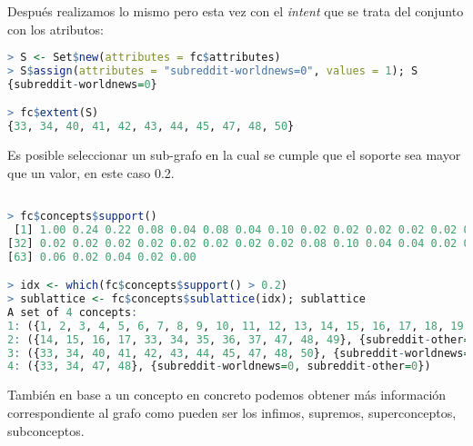 \documentclass[../../main.tex]{subfiles}
\begin{document}
\vskip 0.2in

Después realizamos lo mismo pero esta vez con el \textit{\gls{intent}} que se trata del conjunto con los atributos:

\begin{lstlisting}[language=R]
> S <- Set$new(attributes = fc$attributes)
> S$assign(attributes = "subreddit-worldnews=0", values = 1); S
{subreddit-worldnews=0}

> fc$extent(S)
{33, 34, 40, 41, 42, 43, 44, 45, 47, 48, 50}
\end{lstlisting}

\vskip 0.2in

Es posible seleccionar un sub-grafo en la cual se cumple que el soporte sea mayor que un valor, en este caso 0.2.

\begin{lstlisting}[language=R]

> fc$concepts$support()
 [1] 1.00 0.24 0.22 0.08 0.04 0.08 0.04 0.10 0.02 0.02 0.02 0.02 0.02 0.02 0.02 0.02 0.02 0.02 0.02 0.02 0.02 0.02 0.02 0.02 0.02 0.02 0.02 0.08 0.02 0.02 0.06
[32] 0.02 0.02 0.02 0.02 0.02 0.02 0.02 0.02 0.08 0.10 0.04 0.04 0.02 0.12 0.02 0.02 0.02 0.02 0.02 0.12 0.02 0.02 0.02 0.02 0.04 0.10 0.02 0.08 0.02 0.06 0.02
[63] 0.06 0.02 0.04 0.02 0.00

> idx <- which(fc$concepts$support() > 0.2)
> sublattice <- fc$concepts$sublattice(idx); sublattice
A set of 4 concepts:
1: ({1, 2, 3, 4, 5, 6, 7, 8, 9, 10, 11, 12, 13, 14, 15, 16, 17, 18, 19, 20, 21, 22, 23, 24, 25, 26, 27, 28, 29, 30, 31, 32, 33, 34, 35, 36, 37, 38, 39, 40, 41, 42, 43, 44, 45, 46, 47, 48, 49, 50}, {})
2: ({14, 15, 16, 17, 33, 34, 35, 36, 37, 47, 48, 49}, {subreddit-other=0})
3: ({33, 34, 40, 41, 42, 43, 44, 45, 47, 48, 50}, {subreddit-worldnews=0})
4: ({33, 34, 47, 48}, {subreddit-worldnews=0, subreddit-other=0})
\end{lstlisting}

\vskip 0.2in

También en base a un concepto en concreto podemos obtener más información correspondiente al grafo como pueden ser los infimos, supremos, superconceptos, subconceptos.
\end{document}
